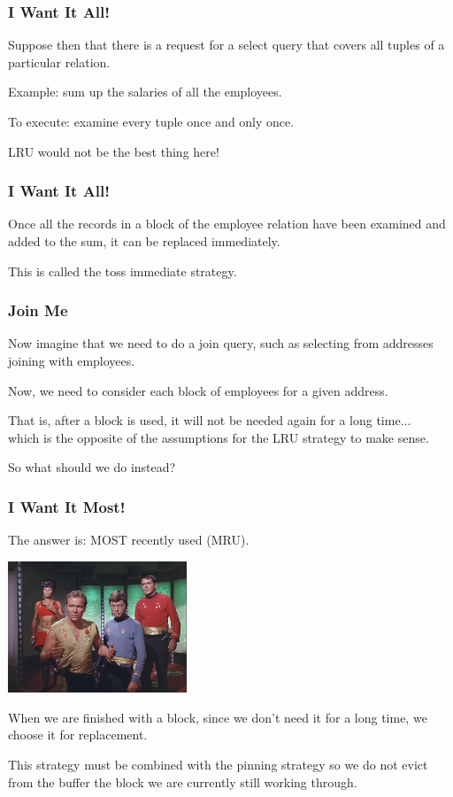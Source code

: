 \begin{frame}
\frametitle{I Want It All!}

Suppose then that there is a request for a select query that covers all tuples of a particular relation. 

Example: sum up the salaries of all the employees. 

To execute: examine every tuple once and only once. 

LRU would not be the best thing here!

\end{frame}

\begin{frame}
\frametitle{I Want It All!}

Once all the records in a block of the employee relation have been examined and added to the sum,  it can be replaced immediately. 

This is called the \alert{toss immediate} strategy.

\end{frame}

\begin{frame}
\frametitle{Join Me}

Now imagine that we need to do a join query, such as selecting from addresses joining with employees. 

Now, we need to consider each block of employees for a given address.

That is, after a block is used, it will not be needed again for a long time...\\
which is the opposite of the assumptions for the LRU strategy to make sense. 

So what should we do instead?

\end{frame}

\begin{frame}
\frametitle{I Want It Most!}
The answer is: MOST recently used (MRU). 

\begin{center}
	\includegraphics[width=0.4\textwidth]{images/mru.jpg}
\end{center}

When we are finished with a block, since we don't need it for a long time, we choose it for replacement.

This strategy must be combined with the pinning strategy so we do not evict from the buffer the block we are currently still working through.

\end{frame}


